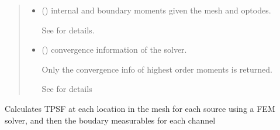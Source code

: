 \documentclass[letterpaper,10pt,english]{sphinxmanual}
\begin{document}
\begin{fulllineitems}
\begin{fulllineitems}
\begin{quote}
\begin{description}
\begin{itemize}
\end{itemize}

\sphinxAtStartPar
\begin{itemize}
\item {} 
\sphinxAtStartPar
{} () \textendash{} internal and boundary moments given the mesh and optodes.

\sphinxAtStartPar
See {\hyperref[\detokenize{_autosummary/nirfasterff.base.data.TRMomentsdata:nirfasterff.base.data.TRMomentsdata}]{}} for details.

\item {} 
\sphinxAtStartPar
{} () \textendash{} convergence information of the solver.

\sphinxAtStartPar
Only the convergence info of highest order moments is returned.

\sphinxAtStartPar
See {\hyperref[\detokenize{_autosummary/nirfasterff.utils.ConvergenceInfo:nirfasterff.utils.ConvergenceInfo}]{}} for details

\end{itemize}


\end{description}\end{quote}

\end{fulllineitems}


\begin{fulllineitems}
\label{\detokenize{_autosummary/nirfasterff.base.stnd_mesh.stndmesh:nirfasterff.base.stnd_mesh.stndmesh.femdata_tpsf}}
\pysigstartsignatures
\pysiglinewithargsret
{}
{\sphinxparamcomma {}\sphinxparamcomma {}\sphinxparamcomma {}\sphinxparamcomma {}\sphinxparamcomma {}}
{}
\pysigstopsignatures
\sphinxAtStartPar
Calculates TPSF at each location in the mesh for each source using a FEM solver, and then the boudary measurables for each channel


\end{fulllineitems}
\end{fulllineitems}
\end{document}
